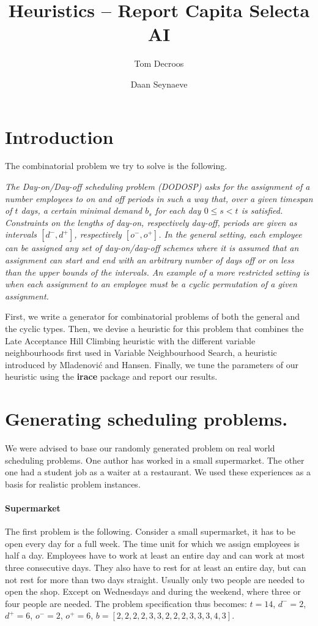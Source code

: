 \documentclass[]{article}
\title{Heuristics -- Report
	Capita Selecta AI}
\author{Tom Decroos \and Daan Seynaeve}
\begin{document}
\maketitle
\section{Introduction}
The combinatorial problem we try to solve is the following.

\textit{The Day-on/Day-off scheduling problem (DODOSP) asks for the assignment of a number employees to on and off periods in such a way that, over a given timespan of $t$ days, a certain minimal demand $b_s$ for each day $0 \leq s < t$ is satisfied. Constraints on the lengths of day-on, respectively day-off, periods are given as intervals $[d^-,d^+]$, respectively $[o^-,o^+]$. In the general setting, each employee can be assigned any set of day-on/day-off schemes where it is assumed that an assignment can start and end with an arbitrary number of days off or on less than the upper bounds of the intervals. An example of a more restricted setting is when each assignment to an employee must be a cyclic permutation of a given assignment.}

First, we write a generator for combinatorial problems of both the general and the cyclic types. Then, we devise a heuristic for this problem that combines the Late Acceptance Hill Climbing heuristic \cite{burke2012late} with the different variable neighbourhoods first used in Variable Neighbourhood Search, a heuristic introduced by Mladenovi{\'c} and Hansen. \cite{mladenovic1997variable} Finally, we tune the parameters of our heuristic using the \textbf{irace} package \cite{LopDubStu2011irace} and report our results.
\section{Generating scheduling problems.}
We were advised to base our randomly generated problem on real world scheduling problems. One author has worked in a small supermarket. The other one had a student job as a waiter at a restaurant. We used these experiences as a basis for realistic problem instances.

\paragraph{Supermarket}
The first problem is the following. Consider a small supermarket, it has to be open every day for a full week. The time unit for which we assign employees is half a day. Employees have to work at least an entire day and can work at most three consecutive days. They also have to rest for at least an entire day, but can not rest for more than two days straight. Usually only two people are needed to open the shop. Except on Wednesdays and during the weekend, where three or four people are needed.
The problem specification thus becomes: $t=14$, $d^- = 2$, $d^+ = 6$, $o^- = 2$, $o^+ = 6$, $b = [2,2,2,2,3,3,2,2,2,3,3,3,4,3]$.
\end{document}
